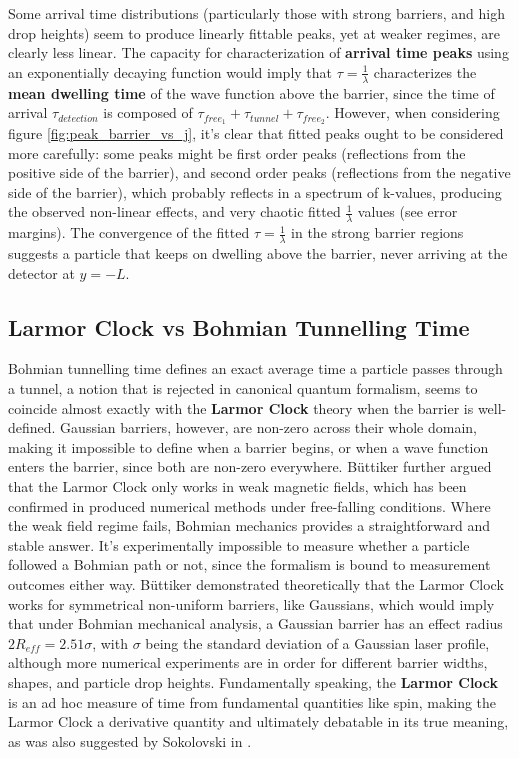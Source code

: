 Some arrival time distributions (particularly those with strong barriers, and high drop heights) seem to produce linearly fittable peaks, yet at weaker regimes, are clearly less linear. The capacity for characterization of \textbf{arrival time peaks} using an exponentially decaying function would imply that $\tau = \frac{1}{\lambda}$ characterizes the \textbf{mean dwelling time} of the wave function above the barrier, since the time of arrival $\tau_{detection}$ is composed of $\tau_{free_1} + \tau_{tunnel} + \tau_{free_2}$. However, when considering figure \ref{fig:peak_barrier_vs_j}, it's clear that fitted peaks ought to be considered more carefully: some peaks might be first order peaks (reflections from the positive side of the barrier), and second order peaks (reflections from the negative side of the barrier), which probably reflects in a spectrum of k-values, producing the observed non-linear effects, and very chaotic fitted $\frac{1}{\lambda}$ values (see error margins). The convergence of the fitted $\tau = \frac{1}{\lambda}$ in the strong barrier regions suggests a particle that keeps on dwelling above the barrier, never arriving at the detector at $y=-L$.

\subsection{Larmor Clock vs Bohmian Tunnelling Time}

Bohmian tunnelling time defines an exact average time a particle passes through a tunnel, a notion that is rejected in canonical quantum formalism, seems to coincide almost exactly with the \textbf{Larmor Clock} theory when the barrier is well-defined. Gaussian barriers, however, are non-zero across their whole domain, making it impossible to define when a barrier begins, or when a wave function enters the barrier, since both are non-zero everywhere. Büttiker further argued that the Larmor Clock only works in weak magnetic fields, which has been confirmed in produced numerical methods under free-falling conditions. Where the weak field regime fails, Bohmian mechanics provides a straightforward and stable answer. It's experimentally impossible to measure whether a particle followed a Bohmian path or not, since the formalism is bound to measurement outcomes either way. Büttiker demonstrated theoretically that the Larmor Clock works for symmetrical non-uniform barriers, like Gaussians, which would imply that under Bohmian mechanical analysis, a Gaussian barrier has an effect radius $2R_{eff}=2.51 \sigma$, with $\sigma$ being the standard deviation of a Gaussian laser profile, although more numerical experiments are in order for different barrier widths, shapes, and particle drop heights. Fundamentally speaking, the \textbf{Larmor Clock} is an ad hoc measure of time from fundamental quantities like spin, making the Larmor Clock a derivative quantity and ultimately debatable in its true meaning, as was also suggested by Sokolovski in \cite{Sokolovski2021}.